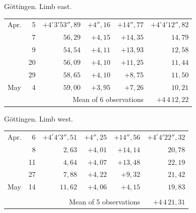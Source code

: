 \noindent\begin{minipage}[t]{.495\textwidth}\centering Göttingen. Limb east.\par\smallskip
{\scriptsize\setlength{\tabcolsep}{1pt}\renewcommand{\arraystretch}{1.2}\begin{tabular}{lr|r|r|r|r|}
Apr.&5&$+4^\circ3'53''{,}89$&$+4''{,}16$&$+14''{,}77$&$+4^\circ4'12''{,}82$\\
&7&$56{,}29$&$+4{,}15$&$+14{,}35$&$14{,}79$\\
&9&$54{,}54$&$+4{,}11$&$+13{,}93$&$12{,}58$\\
&20&$56{,}09$&$+4{,}10$&$+11{,}25$&$11{,}44$\\
&29&$58{,}65$&$+4{,}10$&$+8{,}75$&$11{,}50$\\
May&4&$59{,}00$&$+3{,}95$&$+7{,}26$&$10{,}21$\\
\cline{6-6}\multicolumn{5}{r}{Mean of 6 observations}&$+4\,4\,12{,}22$
\end{tabular}}\end{minipage}\hfill\begin{minipage}[t]{.495\textwidth}\centering Göttingen. Limb west.\par\smallskip
{\scriptsize\setlength{\tabcolsep}{1pt}\renewcommand{\arraystretch}{1.2}\begin{tabular}{lr|r|r|r|r}
Apr.&6&$+4^\circ4'3''{,}51$&$+4''{,}25$&$+14''{,}56$&$+4^\circ4'22''{,}32$\\
&8&$2{,}63$&$+4{,}01$&$+14{,}14$&$20{,}78$\\
&11&$4{,}64$&$+4{,}07$&$+13{,}48$&$22{,}19$\\
&27&$7{,}88$&$+4{,}22$&$+9{,}32$&$21{,}42$\\
May&14&$11{,}62$&$+4{,}06$&$+4{,}15$&$19{,}83$\\
&&&&&\\
\cline{6-6}\multicolumn{5}{r}{Mean of 5 observations}&$+4\,4\,21{,}31$
\end{tabular}}\end{minipage}
\par\vspace{4mm}

